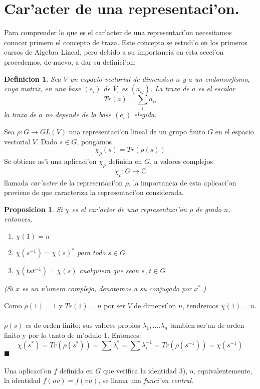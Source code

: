 \documentclass[a4paper,openright,12pt]{report}
\numberwithin{equation}{section} %
\newtheorem{proposicion}{Proposicion}[section] %
\newtheorem{definicion}{Definicion}[section] %
\newenvironment{proof}{\noindent{\it Demostracion:}}{\hfill$\blacksquare$} %
\begin{document}
\section{Car'acter de una representaci'on.}
Para comprender lo que es el car'acter de una representaci'on necesitamos conocer primero el concepto de traza. Este concepto se estudi'o en los primeros cursos de Algebra Lineal, pero debido a su importancia en esta secci'on procedemos, de nuevo, a dar su definici'on:
\begin{definicion}
Sea $V$ un espacio vectorial de dimension $n$ y $a$ un endomorfismo, cuya matriz, en una base $(e_{i})$ de $V$, es $(a_{ij})$. La traza de $a$ es el escalar 
\[
Tr(a)=\sum_{i} a_{ii}
\]
la traza de $a$ no depende de la base $(e_{i})$ elegida.
\end{definicion}
Sea $\rho : G \rightarrow GL(V)$ una representaci'on lineal de un grupo finito $G$ en el espacio vectorial $V$. Dado $s \in G$, pongamos 
\[
\chi_{\rho}(s)=Tr(\rho(s))
\]
Se obtiene as'i una aplicaci'on $\chi_{\rho}$ definida en $G$, a valores complejos
\[
\chi_{\rho} : G \rightarrow \mathbb{C} 
\]    
llamada \emph{car'acter} de la representaci'on $\rho$, la importancia de esta aplicaci'on proviene de que caracteriza la representaci'on considerada.
\begin{proposicion}
Si $\chi$ es el car'acter de una representaci'on $\rho$ de grado $n$, entonces,
\begin{enumerate}
\item $\chi (1)=n$
\item $\chi (s^{-1})=\chi (s)^{*}$ para todo $s \in G$
\item $\chi (tst^{-1})=\chi(s)$ cualquiera que sean $s \, ,t \in G $
\end{enumerate} 
(Si $x$ es un n'umero complejo, denotamos a su conjugado por $x^{*}$.)
\end{proposicion} 
\begin{proof}
Como $\rho (1) = 1$ y $Tr(1)=n$ por ser $V$ de dimensi'on $n$, tendremos $\chi (1)=n$.\\
\\
$\rho (s)$ es de orden finito; sus valores propios $\lambda_{1}, \ldots .\lambda_{n}$ tambien ser'an de orden finito y por lo tanto de m'odulo 1. Entonces:
\[
\chi (s^{*})=Tr(\rho (s^{*}))=\sum \lambda_{i}^{*}= \sum \lambda_{i}^{-1}=Tr(\rho (s^{-1}))=\chi (s^{-1})
\]
\end{proof}\\
\\
Una aplicaci'on $f$ definida en $G$ que verifica la identidad 3), o, equivalentemente, la identidad $f(uv)=f(vu)$, se llama una \emph{funci'on central}. 
\end{document}
